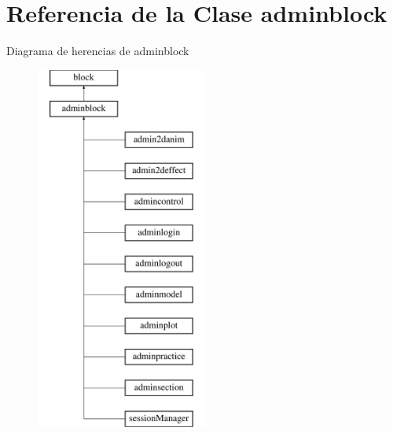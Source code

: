 \hypertarget{classadminblock}{\section{\-Referencia de la \-Clase adminblock}
\label{classadminblock}
}
\-Diagrama de herencias de adminblock\begin{figure}[H]
\begin{center}
\leavevmode
\includegraphics[height=12.000000cm]{classadminblock}
\end{center}
\end{figure}
